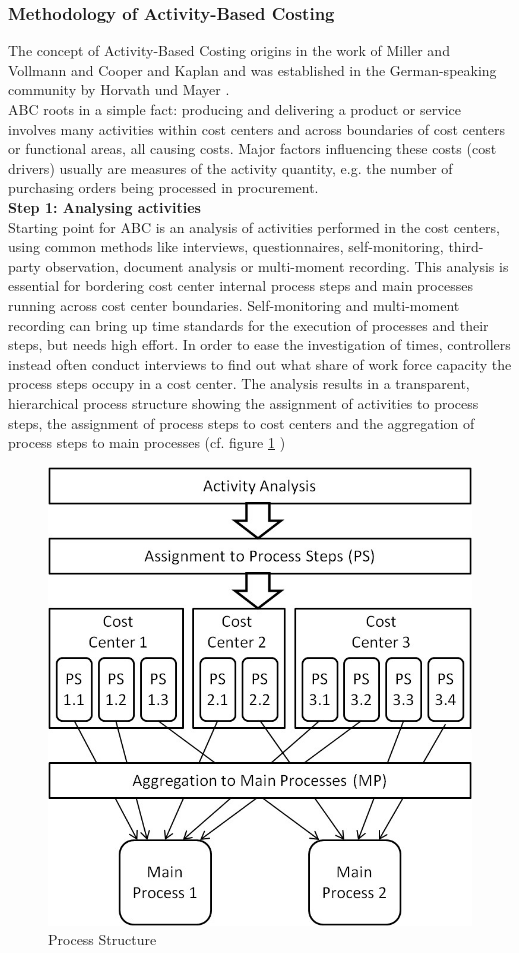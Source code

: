 \subsubsection{Methodology of Activity-Based Costing}
The concept of Activity-Based Costing origins in the work of Miller and Vollmann \cite{article:HiddenFactory} and Cooper and Kaplan \cite{article:MeasureCost} and was established in the German-speaking community by Horvath und Mayer \cite{article:Prozesskosten}.
\\
ABC roots in a simple fact: producing and delivering a product or service involves many activities within cost centers and across boundaries of cost centers or functional areas, all causing costs. Major factors influencing these costs (cost drivers) usually are measures of the activity quantity, e.g. the number of purchasing orders being processed in procurement.
\\
\newline
\textbf{Step 1: Analysing activities}
\\
Starting point for ABC is an analysis of activities performed in the cost centers, using common methods like interviews, questionnaires, self-monitoring, third-party observation, document analysis or multi-moment recording. This analysis is essential for bordering cost center internal process steps and main processes running across cost center boundaries. Self-monitoring and multi-moment recording can bring up time standards for the execution of processes and their steps, but needs high effort. In order to ease the investigation of times, controllers instead often conduct interviews to find out what share of work force capacity the process steps occupy in a cost center.
The analysis results in a transparent, hierarchical process structure showing the assignment of activities to process steps, the assignment of process steps to cost centers and the aggregation of process steps to main processes (cf. figure \ref{fig:ProcessStruct} )

\begin{figure}[htbp]
	\centering
	\includegraphics[width=0.6\linewidth] {Figures/Chapter5/ActivityBased/ProcessStruct.jpg}
	\caption[Process Structure]{Process Structure}
	\label{fig:ProcessStruct}
\end{figure}


